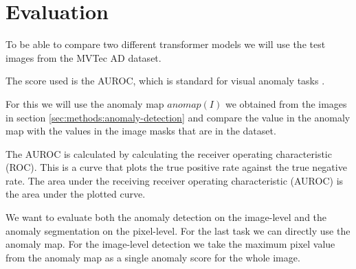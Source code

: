 \section{Evaluation}

To be able to compare two different transformer models we will use the test images from the MVTec AD dataset.

The score used is the AUROC, which is standard for visual anomaly tasks \cite{pirnay_inpainting_2021, zavrtanik_reconstruction_2021, schlegl_unsupervised_2017, li_cutpaste_2021, tsai_autoencoder-based_2021, xie_semisupervised_2021, bergmann_mvtec_2019}.

For this we will use the anomaly map $anomap(I)$ we obtained from the images in section \ref{sec:methods:anomaly-detection} and compare the value in the anomaly map with the values in the image masks that are in the dataset. 

The AUROC is calculated by calculating the receiver operating characteristic (ROC). This is a curve that plots the true positive rate against the true negative rate. The area under the receiving receiver operating characteristic (AUROC) is the area under the plotted curve.

We want to evaluate both the anomaly detection on the image-level and the anomaly segmentation on the pixel-level. For the last task we can directly use the anomaly map. For the image-level detection we take the maximum pixel value from the anomaly map as a single anomaly score for the whole image.